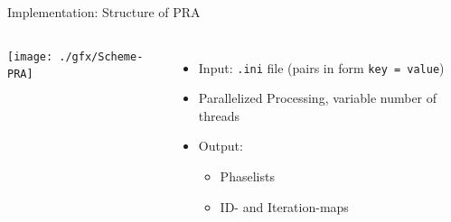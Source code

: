 \begin{frame}{Implementation: Structure of PRA}
%
\begin{columns}[t]
\vspace{-20pt}
\begin{center}
	\texttt{[image: ./gfx/Scheme-PRA]}
\end{center}
%
\begin{itemize}
\item Input: \texttt{.ini} file (pairs in form \texttt{key = value})
\item Parallelized Processing, variable number of threads
\item Output:
	\begin{itemize}
	\item Phaselists
	\item ID- and Iteration-maps
	\end{itemize}
\end{itemize}
\end{columns}
%
\end{frame}


